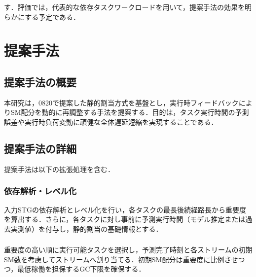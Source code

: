 す．評価では，代表的な依存タスクワークロードを用いて，提案手法の効果を明らかにする予定である．\section{提案手法}\subsection{提案手法の概要}本研究は，0820で提案した静的割当方式を基盤とし，実行時フィードバックによりSM配分を動的に再調整する手法を提案する．目的は，タスク実行時間の予測誤差や実行時負荷変動に頑健な全体遅延短縮を実現することである．\subsection{提案手法の詳細}提案手法は以下の拡張処理を含む．\subsubsection{依存解析・レベル化}入力STGの依存解析とレベル化を行い，各タスクの最長後続経路長から重要度を算出する．さらに，各タスクに対し事前に予測実行時間（モデル推定または過去実測値）を付与し，静的割当の基礎情報とする．\subsubsection{}重要度の高い順に実行可能タスクを選択し，予測完了時刻と各ストリームの初期SM数を考慮してストリームへ割り当てる．初期SM配分は重要度に比例させつつ，最低稼働を担保するGC下限を確保する．\s